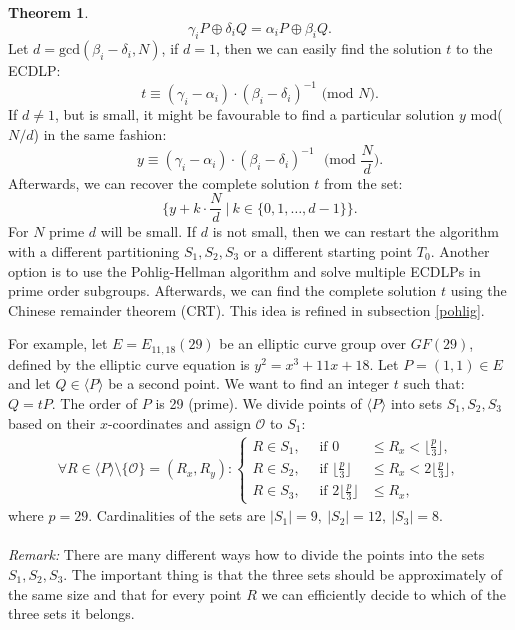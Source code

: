 \documentclass[thesis=M,english]{FITthesis}[2012/10/20]
\theoremstyle{remark}
\theoremstyle{definition}
\newtheorem{theorem}{Theorem}[section]
\begin{document}
\begin{theorem}
$$
\gamma_iP \oplus \delta_iQ = \alpha_iP \oplus \beta_iQ.
$$
Let $d = \text{gcd}(\beta_i - \delta_i, N)$, if $d=1$, then we can easily find the solution $t$ to the ECDLP:
$$
t \equiv (\gamma_i - \alpha_i)\cdot(\beta_i - \delta_i)^{-1} \text{ (mod $N$)}.
$$
If $d \neq 1$, but is small, it might be favourable to find a particular solution $y$ mod($N/d$) in the same fashion:
$$
y \equiv (\gamma_i - \alpha_i)\cdot(\beta_i - \delta_i)^{-1} \text{ $\bigg($mod $\frac{N}{d}\bigg)$}.
$$
Afterwards, we can recover the complete solution $t$ from the set:
$$
\bigg\{y + k\cdot\frac{N}{d}\ \bigg| \ k \in \{0, 1, \ldots, d -1\}\bigg\}.
$$
For $N$ prime $d$ will be small. If $d$ is not small, then we can restart the algorithm with a different partitioning $S_1,S_2,S_3$ or a different starting point $T_0$. Another option is to use the Pohlig-Hellman algorithm and solve multiple ECDLPs in prime order subgroups. Afterwards, we can find the complete solution $t$ using the Chinese remainder theorem (CRT). This idea is refined in subsection \ref{pohlig}.
\end{theorem}
\noindent For example, let $E = E_{11,18}(29)$ be an elliptic curve group over $GF(29)$, defined by the elliptic curve equation is $y^2 = x^3 + 11x + 18$. Let $P = (1,1) \in E$ and let $Q \in \langle P \rangle$ be a second point. We want to find an integer $t$ such that: $Q = tP.$
The order of $P$ is 29 (prime). We divide points of $\langle P \rangle$ into sets $S_1,S_2,S_3$ based on their $x$-coordinates and assign $\mathcal{O}$ to $S_1$:
\begin{align*}
\forall R  \in \langle P \rangle \setminus \{\mathcal{O}\} = (R_x, R_y): \begin{cases} R \in S_1, \quad \text{ if } 0 &\leq R_x < \big\lfloor\frac{p}{3}\big\rfloor, \\ 
R \in S_2, \quad \text{ if } \big\lfloor\frac{p}{3}\big\rfloor &\leq R_x < 2\big\lfloor\frac{p}{3}\big\rfloor, \\
R \in S_3, \quad \text{ if } 2\big\lfloor\frac{p}{3}\big\rfloor &\leq R_x, 
\end{cases}
\end{align*}
where $p = 29.$ Cardinalities of the sets are $|S_1| = 9,\ |S_2| = 12, \ |S_3| = 8.$ 
\\ \\
\noindent \textit{Remark:} There are many different ways how to divide the points into the sets $S_1,S_2,S_3$. The important thing is that the three sets should be approximately of the same size and that for every point $R$ we can efficiently decide to which of the three sets it belongs. \\ \\
\end{document}
